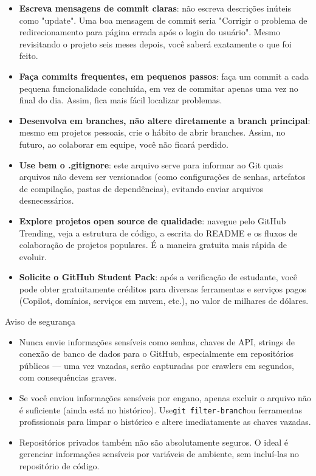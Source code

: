 \begin{itemize}
  \item \textbf{Escreva mensagens de commit claras}: não escreva descrições inúteis como "update". Uma boa mensagem de commit seria "Corrigir o problema de redirecionamento para página errada após o login do usuário". Mesmo revisitando o projeto seis meses depois, você saberá exatamente o que foi feito.
  \item \textbf{Faça commits frequentes, em pequenos passos}: faça um commit a cada pequena funcionalidade concluída, em vez de commitar apenas uma vez no final do dia. Assim, fica mais fácil localizar problemas.
  \item \textbf{Desenvolva em branches, não altere diretamente a branch principal}: mesmo em projetos pessoais, crie o hábito de abrir branches. Assim, no futuro, ao colaborar em equipe, você não ficará perdido.
  \item \textbf{Use bem o .gitignore}: este arquivo serve para informar ao Git quais arquivos não devem ser versionados (como configurações de senhas, artefatos de compilação, pastas de dependências), evitando enviar arquivos desnecessários.
  \item \textbf{Explore projetos open source de qualidade}: navegue pelo GitHub Trending, veja a estrutura de código, a escrita do README e os fluxos de colaboração de projetos populares. É a maneira gratuita mais rápida de evoluir.
  \item \textbf{Solicite o GitHub Student Pack}: após a verificação de estudante, você pode obter gratuitamente créditos para diversas ferramentas e serviços pagos (Copilot, domínios, serviços em nuvem, etc.), no valor de milhares de dólares.
\end{itemize}

\begin{tcbwarn}{Aviso de segurança}
\begin{itemize}
  \item Nunca envie informações sensíveis como senhas, chaves de API, strings de conexão de banco de dados para o GitHub, especialmente em repositórios públicos — uma vez vazadas, serão capturadas por crawlers em segundos, com consequências graves.
  \item Se você enviou informações sensíveis por engano, apenas excluir o arquivo não é suficiente (ainda está no histórico). Use\texttt{git filter-\allowbreak branch}ou ferramentas profissionais para limpar o histórico e altere imediatamente as chaves vazadas.
  \item Repositórios privados também não são absolutamente seguros. O ideal é gerenciar informações sensíveis por variáveis de ambiente, sem incluí-las no repositório de código.
\end{itemize}

\end{tcbwarn}

